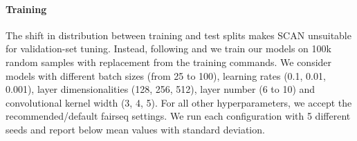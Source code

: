 \paragraph{Training} The shift in distribution between training and
test splits makes SCAN unsuitable for validation-set tuning. Instead,
following  and  we
train our models on 100k random samples with replacement from the
training commands. We consider models with different batch sizes (from
25 to 100), learning rates (0.1, 0.01, 0.001), layer dimensionalities
(128, 256, 512), layer number (6 to 10) and convolutional
kernel width (3, 4, 5). For all other hyperparameters, we accept the
recommended/default fairseq settings. We run each configuration with 5
different seeds and report below mean values with standard deviation.




